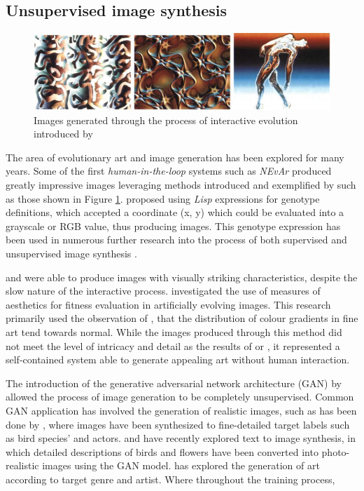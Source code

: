 \documentclass{article}
\begin{document}
	\subsection{Unsupervised image synthesis}
	
	\begin{figure}[h!]
		\includegraphics[width=\textwidth]{images/sims-interactive-image-generation.png}
		\caption{Images generated through the process of interactive evolution introduced by \citet{sims}}
		\label{fig:sims}
	\end{figure}
	
	The area of evolutionary art and image generation has been explored for many years.
	Some of the first \textit{human-in-the-loop} systems such as \textit{NEvAr} \citep{nevar} produced greatly impressive images leveraging methods introduced and exemplified by \citet{sims} such as those shown in Figure \ref{fig:sims}.
	\citet{sims} proposed using \textit{Lisp} expressions for genotype definitions, which accepted a coordinate (x, y) which could be evaluated into a grayscale or RGB value, thus producing images.
	This genotype expression has been used in numerous further research into the process of both supervised and unsupervised image synthesis \citep{nevar, sims, den2011evolving, distributed-evolutionary-art, aesthetic-measures}.
	
	\citet{sims} and \citet{nevar} were able to produce images with visually striking characteristics, despite the slow nature of the interactive process.
	\citet{aesthetic-measures} investigated the use of measures of aesthetics for fitness evaluation in artificially evolving images.
	This research primarily used the observation of \citet{ralph-bell-curve}, that the distribution of colour gradients in fine art tend towards normal.
	While the images produced through this method did not meet the level of intricacy and detail as the results of \citet{sims} or \citet{nevar}, it represented a self-contained system able to generate appealing art without human interaction.
	
	The introduction of the generative adversarial network architecture (GAN) by \citet{GAN} allowed the process of image generation to be completely unsupervised.
	Common GAN application has involved the generation of realistic images, such as has been done by \citet{bao2017cvae}, where images have been synthesized to fine-detailed target labels such as bird species' and actors.
	\citet{zhang2017stackgan} and \citet{reed2016generative} have recently explored text to image synthesis, in which detailed descriptions of birds and flowers have been converted into photo-realistic images using the GAN model.
	\citet{tan2017artgan} has explored the generation of art according to target genre and artist.
	Where throughout the training process,
	
\end{document}
